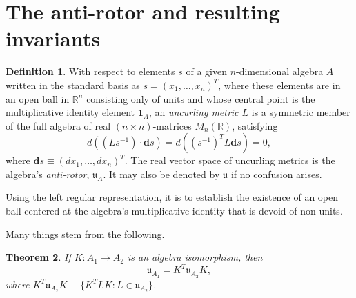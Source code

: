 \documentclass{amsart}
\newtheorem{theorem}{Theorem}
\theoremstyle{definition}
\newtheorem{definition}[theorem]{Definition}
\numberwithin{theorem}{section}
\numberwithin{equation}{section}
\begin{document}
\section{The anti-rotor and resulting invariants}  
     \begin{definition}\label{7/21/23.1} With respect to elements $s$ of a given $n$-dimensional algebra $A$ written in the standard basis as $s= (x_1,\dots,x_n)^T$, where these elements are in an open ball in $\mathbb{R}^n$ consisting only of units and whose central point is the multiplicative identity element $\mathbf{1}_A$, an {\it uncurling metric $L$} is a symmetric member of the full algebra of real $(n\times n)$-matrices $M_n(\mathbb{R})$,  satisfying \begin{equation}\label{5/22/25.3} d\left((Ls^{-1})\cdot \mathbf{d}s\right) = d\left((s^{-1})^T L \mathbf{d}s\right) = 0, \end{equation} where $\mathbf{d}s \equiv (dx_1,\dots,dx_n)^T$.  The real vector space of uncurling metrics is the algebra's {\it anti-rotor}, $\mathfrak{u}_A$.  It may also be denoted by $\mathfrak{u}$ if no confusion arises.    \end{definition}
     
Using the left regular representation, it is to establish the existence of an open ball centered at the algebra's multiplicative identity that is devoid of non-units. 

Many things stem from the following.

  \begin{theorem} \label{6/6/23.1} If $K:A_1\rightarrow A_2$ is an algebra isomorphism, then \begin{equation}\label{5/23/23.1} \mathfrak{u}_{A_1} = K^T \mathfrak{u}_{A_2} K, \end{equation} 
   where $K^T \mathfrak{u}_{A_2} K \equiv \{K^T L K:L\in \mathfrak{u}_{A_2}\}$.
   \end{theorem}
\end{document}
